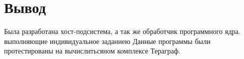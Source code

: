 \section{Вывод}

Была разработана хост-подсистема, а так же обработчик программного ядра. выполняющие индивидуальное заданиею
Данные программы были протестированы на вычислитьсяном комплексе Тераграф.
